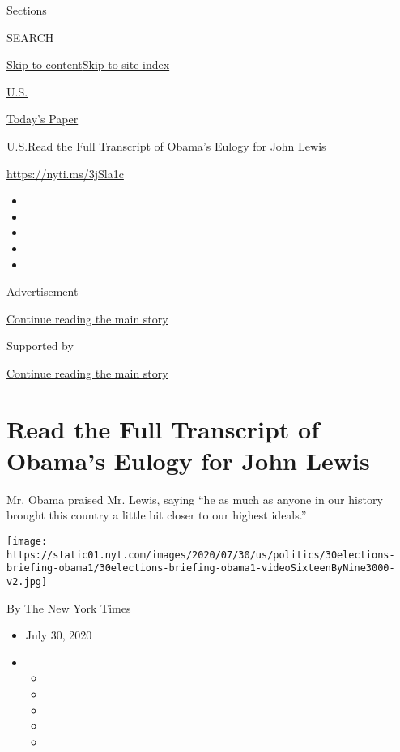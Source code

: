 Sections

SEARCH

\protect\hyperlink{site-content}{Skip to
content}\protect\hyperlink{site-index}{Skip to site index}

\href{https://www.nytimes.com/section/us}{U.S.}

\href{https://myaccount.nytimes.com/auth/login?response_type=cookie\&client_id=vi}{}

\href{https://www.nytimes.com/section/todayspaper}{Today's Paper}

\href{/section/us}{U.S.}\textbar{}Read the Full Transcript of Obama's
Eulogy for John Lewis

\url{https://nyti.ms/3jSla1c}

\begin{itemize}
\item
\item
\item
\item
\item
\end{itemize}

Advertisement

\protect\hyperlink{after-top}{Continue reading the main story}

Supported by

\protect\hyperlink{after-sponsor}{Continue reading the main story}

\hypertarget{read-the-full-transcript-of-obamas-eulogy-for-john-lewis}{%
\section{Read the Full Transcript of Obama's Eulogy for John
Lewis}\label{read-the-full-transcript-of-obamas-eulogy-for-john-lewis}}

Mr. Obama praised Mr. Lewis, saying ``he as much as anyone in our
history brought this country a little bit closer to our highest
ideals.''

\texttt{[image: https://static01.nyt.com/images/2020/07/30/us/politics/30elections-briefing-obama1/30elections-briefing-obama1-videoSixteenByNine3000-v2.jpg]}

By The New York Times

\begin{itemize}
\item
  July 30, 2020
\item
  \begin{itemize}
  \item
  \item
  \item
  \item
  \item
  \end{itemize}
\end{itemize}

